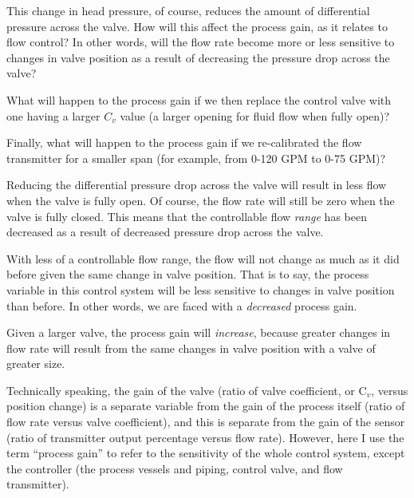 This change in head pressure, of course, reduces the amount of differential pressure across the valve.  How will this affect the process gain, as it relates to flow control?  In other words, will the flow rate become more or less sensitive to changes in valve position as a result of decreasing the pressure drop across the valve?

\vskip 10pt

What will happen to the process gain if we then replace the control valve with one having a larger $C_v$ value (a larger opening for fluid flow when fully open)?

\vskip 10pt

Finally, what will happen to the process gain if we re-calibrated the flow transmitter for a smaller span (for example, from 0-120 GPM to 0-75 GPM)?







Reducing the differential pressure drop across the valve will result in less flow when the valve is fully open.  Of course, the flow rate will still be zero when the valve is fully closed.  This means that the controllable flow {\it range} has been decreased as a result of decreased pressure drop across the valve.

With less of a controllable flow range, the flow will not change as much as it did before given the same change in valve position.  That is to say, the process variable in this control system will be less sensitive to changes in valve position than before.  In other words, we are faced with a {\it decreased} process gain.

\vskip 10pt

Given a larger valve, the process gain will {\it increase}, because greater changes in flow rate will result from the same changes in valve position with a valve of greater size.

Technically speaking, the gain of the valve (ratio of valve coefficient, or C$_{v}$, versus position change) is a separate variable from the gain of the process itself (ratio of flow rate versus valve coefficient), and this is separate from the gain of the sensor (ratio of transmitter output percentage versus flow rate).  However, here I use the term ``process gain'' to refer to the sensitivity of the whole control system, except the controller (the process vessels and piping, control valve, and flow transmitter).

